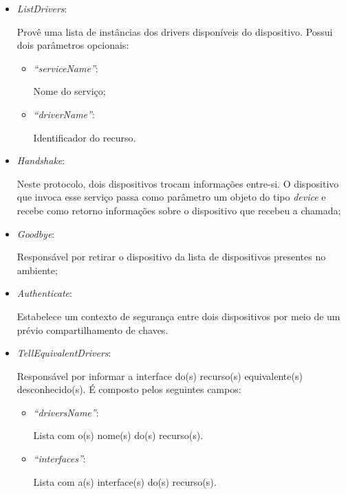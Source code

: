 \begin{itemize}
	\item \emph{ListDrivers}: 

		Provê uma lista de instâncias dos drivers disponíveis do dispositivo. Possui dois parâmetros opcionais:
		\begin{itemize}
			\item \emph{``serviceName''}: 

				Nome do serviço;
			\item \emph{``driverName''}: 

				Identificador do recurso.
		\end{itemize}
	\item \emph{Handshake}: 

		Neste protocolo, dois dispositivos trocam informações entre-si. O dispositivo que invoca esse serviço passa como parâmetro um objeto do tipo \emph{device} e recebe como retorno informações sobre o dispositivo que recebeu a chamada;
	\item \emph{Goodbye}: 

		Responsável por retirar o dispositivo da lista de dispositivos presentes no ambiente;
	\item \emph{Authenticate}: 

		Estabelece um contexto de segurança entre dois dispositivos por meio de um prévio compartilhamento de chaves.
	\item \emph{TellEquivalentDrivers}:

		Responsável por informar a interface do(s) recurso(s) equivalente(s) desconhecido(s). É composto pelos seguintes campos:
		\begin{itemize}
			\item \emph{``driversName''}:

			Lista com o(s) nome(s) do(s) recurso(s).

			\item \emph{``interfaces''}:

			Lista com a(s) interface(s) do(s) recurso(s).
		\end{itemize}
\end{itemize}


\begin{comment}
Serão afetados, ainda, dois protocolos básicos, o \emph{Service Call} e o \emph{Notify}, e o serviço \emph{ListDrivers} dos protocolos \emph{Device Driver} e \emph{Register Driver}. Todos esses serviços contém o parâmetro \emph{driver} que passará a representar uma classe dentre as classes de recursos e não mais o nome do recurso simplesmente.
\end{comment}

